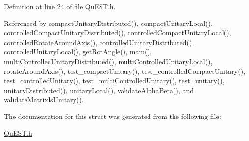 Definition at line 24 of file QuEST.h.

Referenced by compactUnitaryDistributed(), compactUnitaryLocal(), controlledCompactUnitaryDistributed(), controlledCompactUnitaryLocal(), controlledRotateAroundAxis(), controlledUnitaryDistributed(), controlledUnitaryLocal(), getRotAngle(), main(), multiControlledUnitaryDistributed(), multiControlledUnitaryLocal(), rotateAroundAxis(), test\_\-compactUnitary(), test\_\-controlledCompactUnitary(), test\_\-controlledUnitary(), test\_\-multiControlledUnitary(), test\_\-unitary(), unitaryDistributed(), unitaryLocal(), validateAlphaBeta(), and validateMatrixIsUnitary().

The documentation for this struct was generated from the following file:\begin{DoxyCompactItemize}
\item 
\hyperlink{QuEST_8h}{QuEST.h}\end{DoxyCompactItemize}

